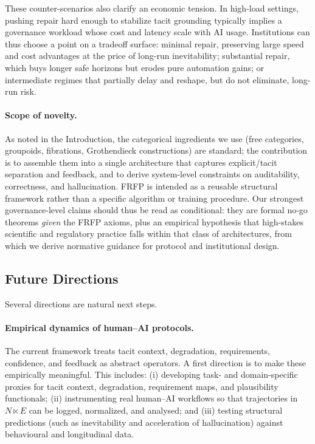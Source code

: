 These counter-scenarios also clarify an economic tension. In high-load settings, pushing repair hard
enough to stabilize tacit grounding typically implies a governance workload whose cost and latency
scale with AI usage. Institutions can thus choose a point on a tradeoff surface: minimal repair,
preserving large speed and cost advantages at the price of long-run inevitability; substantial repair,
which buys longer safe horizons but erodes pure automation gains; or intermediate regimes that
partially delay and reshape, but do not eliminate, long-run risk.


\paragraph{Scope of novelty.}
As noted in the Introduction, the categorical ingredients we use (free categories, groupoids, fibrations, Grothendieck constructions) are standard; the contribution is to assemble them into a single architecture that captures explicit/tacit separation and feedback, and to derive system-level constraints on auditability, correctness, and hallucination. FRFP is intended as a reusable structural framework rather than a specific algorithm or training procedure.
\noindent
Our strongest governance-level claims should thus be read as conditional: they are formal
no-go theorems \emph{given} the FRFP axioms, plus an empirical hypothesis that high-stakes
scientific and regulatory practice falls within that class of architectures, from which we derive
normative guidance for protocol and institutional design.


\subsection{Future Directions}

Several directions are natural next steps.

\paragraph{Empirical dynamics of human--AI protocols.}
The current framework treats tacit context, degradation, requirements, confidence, and feedback as abstract operators. A first direction is to make these empirically meaningful. This includes: (i) developing task- and domain-specific proxies for tacit context, degradation, requirement maps, and plausibility functionals; (ii) instrumenting real human--AI workflows so that trajectories in \(N \ltimes E\) can be logged, normalized, and analysed; and (iii) testing structural predictions (such as inevitability and acceleration of hallucination) against behavioural and longitudinal data.

